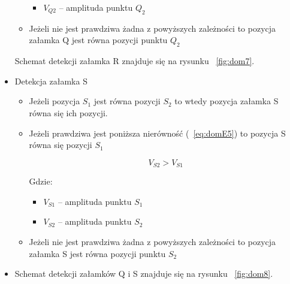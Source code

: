 \documentclass[10pt,a4paper]{article}
\begin{document}
\begin{itemize}
\begin{itemize}
	\begin{itemize}
		\item $V_{Q2}$ – amplituda punktu $Q_2$
	\end{itemize}			
			
	\item Jeżeli nie jest prawdziwa żadna z powyższych zależności to pozycja załamka Q jest równa pozycji punktu $Q_2$
\end{itemize}
	
Schemat detekcji załamka R znajduje się na rysunku ~\ref{fig:dom7}.	
	
	\item Detekcja załamka S
		
	\begin{itemize}
		
	\item Jeżeli pozycja $S_1$ jest równa pozycji $S_2$ to wtedy pozycja załamka S równa się ich pozycji.
	\item Jeżeli prawdziwa jest poniższa nierówność (~\ref{eq:domE5}) to pozycja S równa się pozycji $S_1$
		
	\begin{equation} \label{eq:domE5}
		V_{S2}>V_{S1}		
	\end{equation}
			
Gdzie:
			
	\begin{itemize}
		\item $V_{S1}$ – amplituda punktu $S_1$
		\item $V_{S2}$ – amplituda punktu $S_2$
	\end{itemize}
			
	\item Jeżeli nie jest prawdziwa żadna z powyższych zależności to pozycja załamka S jest równa pozycji punktu $S_2$
		
	\end{itemize}	
		
	\item Schemat detekcji załamków Q i S znajduje się na rysunku ~\ref{fig:dom8}.
		

\end{itemize}
\end{document}
